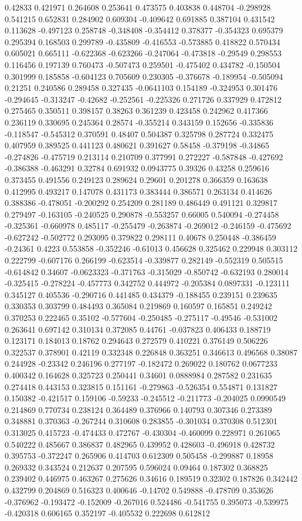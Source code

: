 0.42833 0.421971 0.264608 0.253641 0.473575 0.403838 0.448704 -0.298928 0.541215 0.652831 0.284902 0.609304 -0.409642 0.691885 0.387104 0.431542 0.113628 -0.497123 0.258748 -0.348408 -0.354412 0.378377 -0.354323 0.695379 0.295394 0.168503 0.299789 -0.435809 -0.416553 -0.573885 0.418822 0.570434 0.605021 0.665111 -0.622368 -0.623266 -0.247064 -0.473818 -0.29549 0.298553 0.116456 0.197139 0.760473 -0.507473 0.259501 -0.475402 0.434782 -0.150504 0.301999 0.185858 -0.604123 0.705609 0.230305 -0.376678 -0.189954 -0.505094 0.21251 0.240586 0.289458 0.327435 -0.0641103 0.154189 -0.324953 0.301476 -0.294645 -0.313247 -0.42682 -0.252561 -0.225326 0.271726 0.337929 0.472812 0.275465 0.350511 0.398157 0.38263 0.361239 0.423458 0.242962 0.417366 0.236119 0.330695 0.245364 0.28574 -0.355214 0.343159 0.152656 -0.335836 -0.118547 -0.545312 0.370591 0.48407 0.504387 0.325798 0.287724 0.332475 0.407959 0.389525 0.441123 0.480621 0.391627 0.58458 -0.379198 -0.34865 -0.274826 -0.475719 0.213114 0.210709 0.377991 0.272227 -0.587848 -0.427692 -0.386388 -0.463291 0.32784 0.691932 0.0943775 0.39326 0.43258 0.259616 0.373455 0.491556 0.249123 0.289624 0.29601 0.201278 0.366359 0.163638 0.412995 0.493217 0.147078 0.431173 0.383444 0.386571 0.263134 0.414626 0.388386 -0.478051 -0.200292 0.254209 0.281189 0.486449 0.491121 0.329817 0.279497 -0.163105 -0.240525 0.290878 -0.553257 0.66005 0.540094 -0.274458 -0.325361 -0.660978 0.485117 -0.255479 -0.263874 -0.269012 -0.246159 -0.475692 -0.627242 -0.502772 0.293095 0.379822 0.298111 0.40678 0.250448 -0.386459 -0.24361 0.4223 0.553858 -0.352246 -0.61013 0.456628 0.325462 0.229948 0.303112 0.222799 -0.607176 0.266199 -0.623514 -0.339877 0.282149 -0.552319 0.505515 -0.614842 0.34607 -0.0623323 -0.371763 -0.315029 -0.850742 -0.632193 0.280014 -0.325415 -0.278224 -0.457773 0.342752 0.444972 -0.205384 0.0897331 -0.123111 0.345127 0.405536 -0.290716 0.441485 0.434379 -0.188455 0.239151 0.239635 0.330353 0.303799 0.484493 0.365084 0.219869 0.160597 0.165851 0.249242 0.370253 0.222465 0.35102 -0.577604 -0.250485 -0.275117 -0.49546 -0.531002 0.263641 0.697142 0.310134 0.372085 0.44761 -0.037823 0.406433 0.188719 0.123171 0.184013 0.18762 0.294643 0.272579 0.410221 0.376149 0.506226 0.322537 0.378901 0.42119 0.332348 0.226848 0.363251 0.346613 0.496568 0.38087 0.244928 -0.23342 0.246196 0.277197 -0.182472 0.269022 0.180762 0.0677233 0.400342 0.164628 0.325723 0.250441 0.34601 0.0888984 0.287582 0.231635 0.274418 0.443153 0.323815 0.151161 -0.279863 -0.526354 0.554871 0.131827 0.150382 -0.421517 0.159106 -0.59233 -0.245512 -0.211773 -0.204025 0.0990549 0.214869 0.770734 0.238124 0.364489 0.376966 0.140793 0.307346 0.273389 0.348881 0.370363 -0.267244 0.310608 0.283855 -0.301034 0.370308 0.512301 0.313025 0.415723 -0.474433 0.472767 -0.430304 -0.460099 0.228971 0.261065 0.540222 0.485667 0.386837 0.482965 0.439952 0.428603 -0.496918 0.428732 0.395753 -0.372247 0.265906 0.414703 0.612309 0.505458 -0.299887 0.18958 0.269332 0.343524 0.212637 0.207595 0.596024 0.09464 0.187302 0.368825 0.239402 0.446975 0.463267 0.275626 0.34616 0.189519 0.32302 0.187826 0.342442 0.432799 0.204869 0.516323 0.400646 -0.14702 0.549888 -0.478709 0.353626 -0.376962 -0.193472 -0.152009 -0.267016 0.524486 -0.541755 0.395073 -0.539975 -0.420318 0.606165 0.352197 -0.405532 0.222698 0.612812 